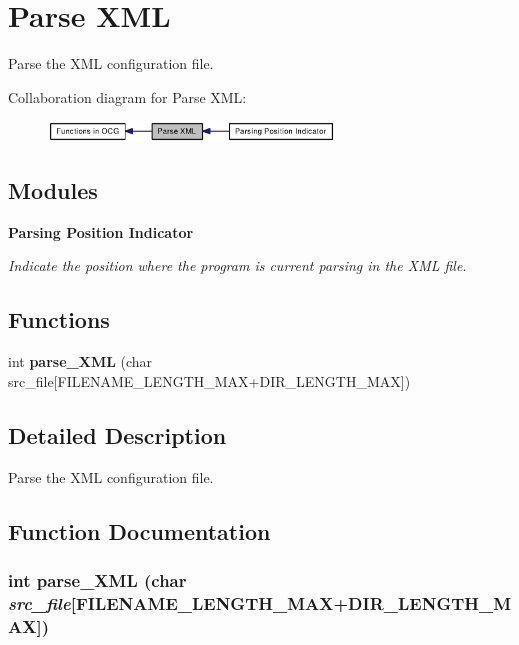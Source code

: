 \section{Parse XML}
\label{group____parse__XML}
Parse the XML configuration file.  




Collaboration diagram for Parse XML:\nopagebreak
\begin{figure}[H]
\begin{center}
\leavevmode
\includegraphics[width=215pt]{group____parse__XML}
\end{center}
\end{figure}
\subsection*{Modules}
\begin{CompactItemize}
\item 
{\bf Parsing Position Indicator}
\begin{CompactList}\small\item\em Indicate the position where the program is current parsing in the XML file. \item\end{CompactList}

\end{CompactItemize}
\subsection*{Functions}
\begin{CompactItemize}
\item 
int {\bf parse\_\-XML} (char src\_\-file[FILENAME\_\-LENGTH\_\-MAX+DIR\_\-LENGTH\_\-MAX])
\end{CompactItemize}


\subsection{Detailed Description}
Parse the XML configuration file. 

\subsection{Function Documentation}
\subsubsection[{parse\_\-XML}]{\setlength{\rightskip}{0pt plus 5cm}int parse\_\-XML (char {\em src\_\-file}[FILENAME\_\-LENGTH\_\-MAX+DIR\_\-LENGTH\_\-MAX])}\label{group____parse__XML_gfc1e652560c50b9200f9cec586024088}


